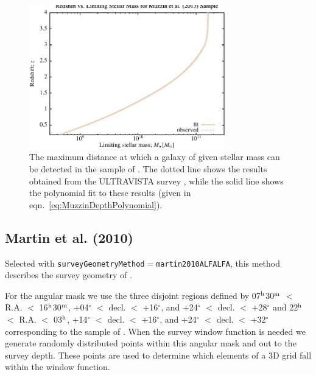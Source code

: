 \begin{figure}
 \begin{center}
 \includegraphics[width=85mm,trim=0mm 0mm 0mm 4mm,clip]{Plots/DataAnalysis/MuzzinULTRAVISTAMassRedshiftRelation.pdf}
 \end{center}
 \caption{The maximum distance at which a galaxy of given stellar mass can be detected in the sample of \protect\cite{muzzin_evolution_2013}. The dotted line shows the results obtained from the ULTRAVISTA survey \protect\citep{muzzin_evolution_2013}, while the solid line shows the polynomial fit to these results (given in eqn.~\ref{eq:MuzzinDepthPolynomial}).}
 \label{fig:MuzzinULTRAVISTADepthFit}
\end{figure}

\subsection{Martin et al. (2010)}\label{phys:surveyGeometry:surveyGeometryMartin2010ALFALFA}

Selected with {\tt surveyGeometryMethod}$=${\tt martin2010ALFALFA}, this method describes the survey geometry of \cite{martin_arecibo_2010}. 

For the angular mask we use the three disjoint regions defined by 07$^{\rm h}$30$^{\rm m}$ $<$ R.A. $<$ 16$^{\rm h}$30$^{\rm m}$, +04$^\circ$ $<$ decl. $<$ +16$^\circ$, and +24$^\circ$ $<$ decl. $<$ +28$^\circ$ and 22$^{\rm h}$ $<$ R.A. $<$ 03$^{\rm h}$, +14$^\circ$ $<$ decl. $<$ +16$^\circ$, and +24$^\circ$ $<$ decl. $<$ +32$^\circ$ corresponding to the sample of \cite{martin_arecibo_2010}. When the survey window function is needed we generate randomly distributed points within this angular mask and out to the survey depth. These points are used to determine which elements of a 3D grid fall within the window function.

